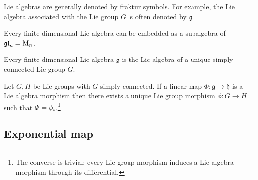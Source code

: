         \begin{notation}
        	Lie algebras are generally denoted by fraktur symbols. For example, the Lie algebra associated with the Lie group $G$ is often denoted by $\mathfrak{g}$.
        \end{notation}
        
	\begin{theorem}[Ado]\label{lie:theorem:ado}
		Every finite-dimensional Lie algebra can be embedded as a subalgebra of $\mathfrak{gl}_n = \textup{M}_n$.
	\end{theorem}
	\begin{theorem}
		Every finite-dimensional Lie algebra $\mathfrak{g}$ is the Lie algebra of a unique simply-connected Lie group $G$.
	\end{theorem}
	
	\begin{property}\label{lie:prop_hom}
		Let $G, H$ be Lie groups with $G$ simply-connected. If a linear map $\Phi:\mathfrak{g}\rightarrow\mathfrak{h}$ is a Lie algebra morphism then there exists a unique Lie group morphism $\phi:G\rightarrow H$ such that $\Phi = \phi_*$.\footnote{The converse is trivial: every Lie group morphism induces a Lie algebra morphism through its differential.}
	\end{property}

\subsection{Exponential map}
	
